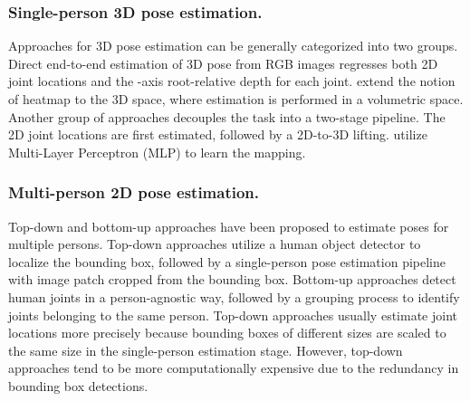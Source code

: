 \documentclass[runningheads]{llncs}
\begin{document}
\subsubsection{Single-person 3D pose estimation.}
Approaches for 3D pose estimation can be generally categorized into two groups. Direct end-to-end estimation of 3D pose from RGB images regresses both 2D joint locations and the -axis root-relative depth for each joint. \cite{pavlakos2017coarse,sun2018integral} extend the notion of heatmap to the 3D space, where estimation is performed in a volumetric space. Another group of approaches decouples the task into a two-stage pipeline. The 2D joint locations are first estimated, followed by a 2D-to-3D lifting. \cite{martinez2017simple,fang2018learning} utilize Multi-Layer Perceptron (MLP) to learn the mapping.

\subsubsection{Multi-person 2D pose estimation.}
Top-down \cite{he2017mask,fang2017rmpe,huang2017coarse,chen2018cascaded,sun2019deep} and bottom-up \cite{newell2017associative,cao2017realtime,papandreou2018personlab} approaches have been proposed to estimate poses for multiple persons. Top-down approaches utilize a human object detector to localize the bounding box, followed by a single-person pose estimation pipeline with image patch cropped from the bounding box. Bottom-up approaches detect human joints in a person-agnostic way, followed by a grouping process to identify joints belonging to the same person. Top-down approaches usually estimate joint locations more precisely because bounding boxes of different sizes are scaled to the same size in the single-person estimation stage. However, top-down approaches tend to be more computationally expensive due to the redundancy in bounding box detections.
\end{document}
